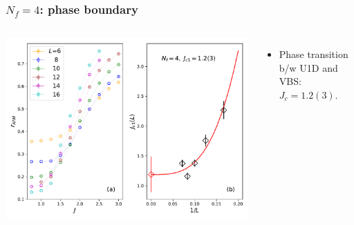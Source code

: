 \documentclass[xcolor=table, 10pt, aspectratio=43]{beamer}
\begin{document}
\begin{frame}
  \frametitle{$N_f=4$: phase boundary}
  \begin{columns}
    \includegraphics[width=\textwidth]{../u1sl/n4rvbs}
		\begin{itemize}
			\item Phase transition b/w U1D and VBS: $J_c=1.2(3)$.
		\end{itemize}
  \end{columns}
\end{frame}
\end{document}
